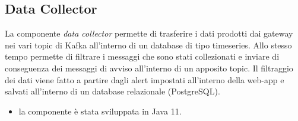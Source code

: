 \subsection{Data Collector}
	La componente \textit{data collector} permette di trasferire i dati prodotti dai gateway nei vari topic di Kafka all'interno di un database di tipo timeseries. Allo stesso tempo permette di filtrare i messaggi che sono stati collezionati e inviare di conseguenza dei messaggi di avviso all'interno di un apposito topic.
	Il filtraggio dei dati viene fatto a partire dagli alert impostati all'interno della web-app e salvati all'interno di un database relazionale (PostgreSQL).
	\begin{itemize}
		\item la componente è stata sviluppata in Java 11.
	\end{itemize}

